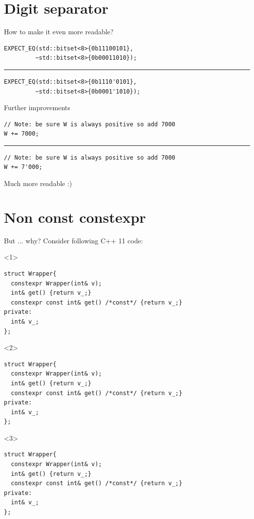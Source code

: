 \documentclass[10pt]{beamer}
\begin{document}
\section{Digit separator}
\begin{frame}[fragile]{How to make it even more readable?}
\vfill
\begin{verbatim}
EXPECT_EQ(std::bitset<8>{0b11100101},
         ~std::bitset<8>{0b00011010});
\end{verbatim}
\vfill
\pause
\hrule
\vfill
\begin{verbatim}
EXPECT_EQ(std::bitset<8>{0b1110'0101},
         ~std::bitset<8>{0b0001'1010});
\end{verbatim}
\vfill
\end{frame}

\begin{frame}[fragile]{Further improvements}
	\begin{verbatim}
// Note: be sure W is always positive so add 7000
W += 7000;
	\end{verbatim}

	\pause 
	\hrule
	\begin{verbatim}
// Note: be sure W is always positive so add 7000
W += 7'000;	
	\end{verbatim}

	Much more readable :)

\end{frame}

\section{Non const constexpr}
\begin{frame}[fragile]{But ... why?}
	\centering Consider following C++ 11 code:

	\begin{onlyenv}
	\begin{verbatim}
struct Wrapper{
  constexpr Wrapper(int& v);
  int& get() {return v_;}
  constexpr const int& get() /*const*/ {return v_;} 
private:
  int& v_;
};
	\end{verbatim}
	\end{onlyenv}

	\begin{onlyenv}
	\begin{verbatim}
struct Wrapper{
  constexpr Wrapper(int& v);
  int& get() {return v_;}
  constexpr const int& get() /*const*/ {return v_;} 
private:
  int& v_;
};
	\end{verbatim}
	\end{onlyenv}

	\begin{onlyenv}
	\begin{verbatim}
struct Wrapper{
  constexpr Wrapper(int& v);
  int& get() {return v_;}
  constexpr const int& get() /*const*/ {return v_;} 
private:
  int& v_;
};
	\end{verbatim}
	\end{onlyenv}
\end{frame}
\end{document}
